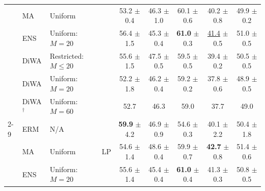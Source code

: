 \begin{table}[h]
{\begin{tabular}{llll|ccccc}
             & MA \cite{arpit2021ensemble}                        & Uniform                   &                                                & 53.2 $\pm$ 0.4             & 46.3 $\pm$ 1.0             & 60.1 $\pm$ 0.6          & 40.2 $\pm$ 0.8             & 49.9 $\pm$ 0.2             \\
             & ENS                                                & Uniform: $M=20$           &                                                & 56.4 $\pm$ 1.5             & 45.3 $\pm$ 0.4             & \textbf{61.0} $\pm$ 0.3 & \underline{41.4} $\pm$ 0.5 & 51.0 $\pm$ 0.5             \\
             & DiWA                                               & Restricted: $M \leq 20$   &                                                & 55.6 $\pm$ 1.5             & 47.5 $\pm$ 0.5             & 59.5 $\pm$ 0.5          & 39.4 $\pm$ 0.2             & 50.5 $\pm$ 0.5             \\
             & DiWA                                               & Uniform: $M=20$           &                                                & 52.2 $\pm$ 1.8             & 46.2 $\pm$ 0.4             & 59.2 $\pm$ 0.2          & 37.8 $\pm$ 0.6             & 48.9 $\pm$ 0.5             \\
             & DiWA$^{\dagger}$                                   & Uniform: $M=60$           &                                                & 52.7                       & 46.3                       & 59.0                    & 37.7                       & 49.0                       \\
            \cmidrule{2-9}
             & ERM                                                & N/A                       & \multirow{7}{*}{LP \cite{kumar2022finetuning}} & \textbf{59.9} $\pm$ 4.2    & 46.9 $\pm$ 0.9             & 54.6 $\pm$ 0.3          & 40.1 $\pm$ 2.2             & 50.4 $\pm$ 1.8             \\
             & MA \cite{arpit2021ensemble}                        & Uniform                   &                                                & 54.6 $\pm$ 1.4             & 48.6 $\pm$ 0.4             & 59.9 $\pm$ 0.7          & \textbf{42.7} $\pm$ 0.8    & 51.4 $\pm$ 0.6             \\
             & ENS                                                & Uniform: $M=20$           &                                                & 55.6 $\pm$ 1.4             & 45.4 $\pm$ 0.4             & \textbf{61.0} $\pm$ 0.4 & 41.3 $\pm$ 0.3             & 50.8 $\pm$ 0.5             \\

\end{tabular}}
\end{table}
